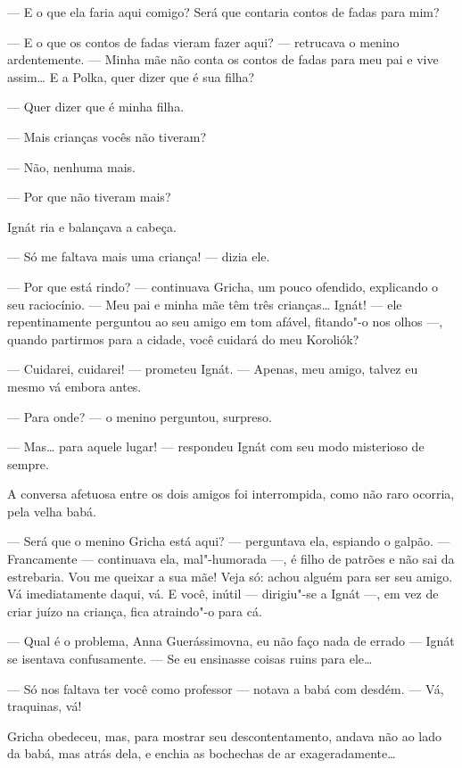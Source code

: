 --- E o que ela faria aqui comigo? Será que contaria contos de fadas
para mim?

--- E o que os contos de fadas vieram fazer aqui? --- retrucava o menino
ardentemente. --- Minha mãe não conta os contos de fadas para meu pai e
vive assim\ldots{} E a Polka, quer dizer que é sua filha?

--- Quer dizer que é minha filha.

--- Mais crianças vocês não tiveram?

--- Não, nenhuma mais.

--- Por que não tiveram mais?

Ignát ria e balançava a cabeça.

--- Só me faltava mais uma criança! --- dizia ele.

--- Por que está rindo? --- continuava Gricha, um pouco ofendido,
explicando o seu raciocínio. --- Meu pai e minha mãe têm três
crianças\ldots{} Ignát! --- ele repentinamente perguntou ao seu amigo em tom
afável, fitando"-o nos olhos ---, quando partirmos para a cidade, você
cuidará do meu Koroliók?

--- Cuidarei, cuidarei! --- prometeu Ignát. --- Apenas, meu amigo,
talvez eu mesmo vá embora antes.

--- Para onde? --- o menino perguntou, surpreso.

--- Mas\ldots{} para aquele lugar! --- respondeu Ignát com seu modo
misterioso de sempre.

A conversa afetuosa entre os dois amigos foi interrompida, como não raro
ocorria, pela velha babá.

--- Será que o menino Gricha está aqui? --- perguntava ela, espiando o
galpão. --- Francamente --- continuava ela, mal"-humorada ---, é filho de
patrões e não sai da estrebaria. Vou me queixar a sua mãe! Veja só:
achou alguém para ser seu amigo. Vá imediatamente daqui, vá. E você,
inútil --- dirigiu"-se a Ignát ---, em vez de criar juízo na criança,
fica atraindo"-o para cá.

--- Qual é o problema, Anna Guerássimovna, eu não faço nada de errado
--- Ignát se isentava confusamente. --- Se eu ensinasse coisas ruins
para ele\ldots{}

--- Só nos faltava ter você como professor --- notava a babá com desdém.
--- Vá, traquinas, vá!

Gricha obedeceu, mas, para mostrar seu descontentamento, andava não ao
lado da babá, mas atrás dela, e enchia as bochechas de ar
exageradamente\ldots{}

